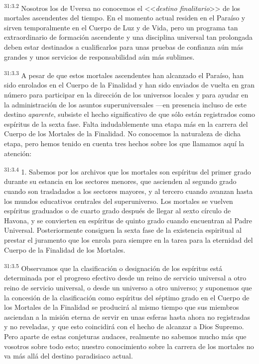 \par
\textsuperscript{31:3.2} Nosotros los de Uversa no conocemos el <<\textit{destino finalitario}>> de los mortales ascendentes del tiempo. En el momento actual residen en el Paraíso y sirven temporalmente en el Cuerpo de Luz y de Vida, pero un programa tan extraordinario de formación ascendente y una disciplina universal tan prolongada deben estar destinados a cualificarlos para unas pruebas de confianza aún más grandes y unos servicios de responsabilidad aún más sublimes.

\par
\textsuperscript{31:3.3} A pesar de que estos mortales ascendentes han alcanzado el Paraíso, han sido enrolados en el Cuerpo de la Finalidad y han sido enviados de vuelta en gran número para participar en la dirección de los universos locales y para ayudar en la administración de los asuntos superuniversales ---en presencia incluso de este destino \textit{aparente}, subsiste el hecho significativo de que sólo están registrados como espíritus de la sexta fase. Falta indudablemente una etapa más en la carrera del Cuerpo de los Mortales de la Finalidad. No conocemos la naturaleza de dicha etapa, pero hemos tenido en cuenta tres hechos sobre los que llamamos aquí la atención:

\par
\textsuperscript{31:3.4} 1. Sabemos por los archivos que los mortales son espíritus del primer grado durante su estancia en los sectores menores, que ascienden al segundo grado cuando son trasladados a los sectores mayores, y al tercero cuando avanzan hasta los mundos educativos centrales del superuniverso. Los mortales se vuelven espíritus graduados o de cuarto grado después de llegar al sexto círculo de Havona, y se convierten en espíritus de quinto grado cuando encuentran al Padre Universal. Posteriormente consiguen la sexta fase de la existencia espiritual al prestar el juramento que los enrola para siempre en la tarea para la eternidad del Cuerpo de la Finalidad de los Mortales.

\par
\textsuperscript{31:3.5} Observamos que la clasificación o designación de los espíritus está determinada por el progreso efectivo desde un reino de servicio universal a otro reino de servicio universal, o desde un universo a otro universo; y suponemos que la concesión de la clasificación como espíritus del séptimo grado en el Cuerpo de los Mortales de la Finalidad se producirá al mismo tiempo que sus miembros asciendan a la misión eterna de servir en unas esferas hasta ahora no registradas y no reveladas, y que esto coincidirá con el hecho de alcanzar a Dios Supremo. Pero aparte de estas conjeturas audaces, realmente no sabemos mucho más que vosotros sobre todo esto; nuestro conocimiento sobre la carrera de los mortales no va más allá del destino paradisiaco actual.

